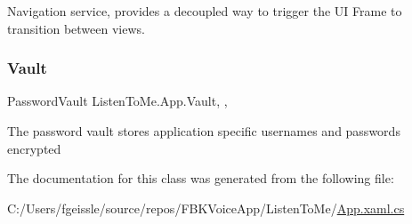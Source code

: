 Navigation service, provides a decoupled way to trigger the UI Frame to transition between views. 

\mbox{\label{class_listen_to_me_1_1_app_ad1b3a77f44f52055446727716abfccc6}} 
\subsubsection{\texorpdfstring{Vault}{Vault}}
{\footnotesize\ttfamily Password\+Vault Listen\+To\+Me.\+App.\+Vault\hspace{0.3cm}{\ttfamily [static]}, {\ttfamily [get]}, {\ttfamily [set]}}



The password vault stores application specific usernames and passwords encrypted 



The documentation for this class was generated from the following file\+:\begin{DoxyCompactItemize}
\item 
C\+:/\+Users/fgeissle/source/repos/\+F\+B\+K\+Voice\+App/\+Listen\+To\+Me/\mbox{\hyperlink{_app_8xaml_8cs}{App.\+xaml.\+cs}}\end{DoxyCompactItemize}
